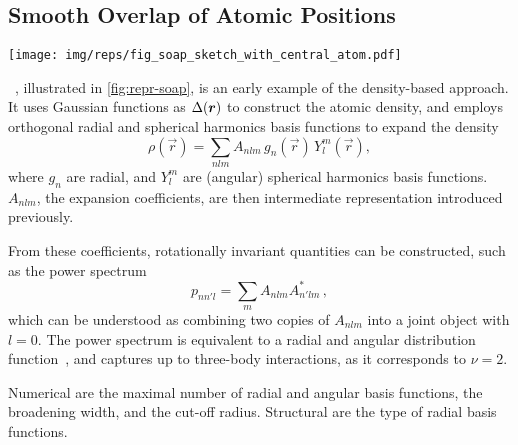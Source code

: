 \subsection{Smooth Overlap of Atomic Positions}

\begin{figure*}
  \centering
  \texttt{[image: img/reps/fig\_soap\_sketch\_with\_central\_atom.pdf]}
  \caption{
  	Illustration of the \gls{soap} representation.
    The local density around a central atom is modeled by atom-centred normal distributions and expanded into radial and spherical harmonics basis functions.
  }
  \label{fig:repr-soap}
\end{figure*}

\noindent
\soap~\cite{bkc2013q}, illustrated in \cref{fig:repr-soap}, is an early example of the density-based approach. It uses Gaussian functions as $\Delta(\boldsymbol{r})$ to construct the atomic density, and employs orthogonal radial and spherical harmonics basis functions to expand the density
%
\begin{equation}
	\rho(\vec r) = \sum_{nlm} A_{nlm} \, g_n(\vec{r}) \, Y_l^m(\vec{r}) ,
\end{equation}
%
where $g_n$ are radial, and $Y_l^m$ are (angular) spherical harmonics basis functions. $A_{nlm}$, the expansion coefficients, are then intermediate representation introduced previously.

From these coefficients, rotationally invariant quantities can be constructed, such as the {power spectrum} 
%
\begin{equation}
	\label{equ:powerspectrum}
	p_{nn'l} = \sum_m A_{nlm} A^*_{n'lm}\,  ,
\end{equation}
which can be understood as combining two copies of $A_{nlm}$ into a joint object with $l=0$.
% 
The power spectrum is equivalent to a radial and angular distribution function~\cite{jkk2019q}, and captures up to three-body interactions, as it corresponds to $\nu = 2$. %

Numerical \hps are the maximal number of radial and angular basis functions, the broadening width, and the cut-off radius. Structural \hps are the type of radial basis functions.

